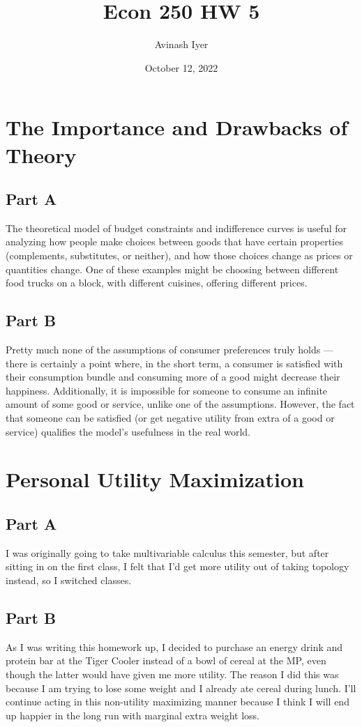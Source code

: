 \documentclass[8pt]{extarticle}
\title{Econ 250 HW 5}
\author{Avinash Iyer}
\date{October 12, 2022}
\begin{document}
{
\maketitle
\section*{The Importance and Drawbacks of Theory}
\subsection*{Part A}
The theoretical model of budget constraints and indifference curves is useful for analyzing how people make choices between goods that have certain properties (complements, substitutes, or neither), and how those choices change as prices or quantities change. One of these examples might be choosing between different food trucks on a block, with different cuisines, offering different prices.
\subsection*{Part B}
Pretty much none of the assumptions of consumer preferences truly holds — there is certainly a point where, in the short term, a consumer is satisfied with their consumption bundle and consuming more of a good might decrease their happiness. Additionally, it is impossible for someone to consume an infinite amount of some good or service, unlike one of the assumptions. However, the fact that someone can be satisfied (or get negative utility from extra of a good or service) qualifies the model's usefulness in the real world.
\section*{Personal Utility Maximization}
\subsection*{Part A}
I was originally going to take multivariable calculus this semester, but after sitting in on the first class, I felt that I'd get more utility out of taking topology instead, so I switched classes.
\subsection*{Part B}
As I was writing this homework up, I decided to purchase an energy drink and protein bar at the Tiger Cooler instead of a bowl of cereal at the MP, even though the latter would have given me more utility. The reason I did this was because I am trying to lose some weight and I already ate cereal during lunch. I'll continue acting in this non-utility maximizing manner because I think I will end up happier in the long run with marginal extra weight loss.
}
\end{document}
